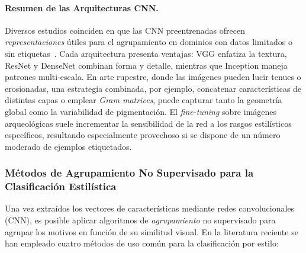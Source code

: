 \paragraph{Resumen de las Arquitecturas CNN.}
Diversos estudios coinciden en que las CNN preentrenadas ofrecen \textit{representaciones} útiles para el agrupamiento en dominios con datos limitados o sin etiquetas~\cite{guerin2018,gairola2020}.
Cada arquitectura presenta ventajas: VGG enfatiza la textura, ResNet y DenseNet combinan forma y detalle, mientras que Inception maneja patrones multi-escala.
En arte rupestre, donde las imágenes pueden lucir tenues o erosionadas, una estrategia combinada, por ejemplo, concatenar características de distintas capas o emplear \textit{Gram matrices}, puede capturar tanto la geometría global como la variabilidad de pigmentación.
El \textit{fine-tuning} sobre imágenes arqueológicas suele incrementar la sensibilidad de la red a los rasgos estilísticos específicos, resultando especialmente provechoso si se dispone de un número moderado de ejemplos etiquetados.

\subsubsection{Métodos de Agrupamiento No Supervisado para la Clasificación Estilística }

Una vez extraídos los vectores de características mediante redes convolucionales (CNN), es posible aplicar algoritmos de \textit{agrupamiento} no supervisado para agrupar los motivos en función de su similitud visual.
En la literatura reciente se han empleado cuatro métodos de uso común para la clasificación por estilo:

